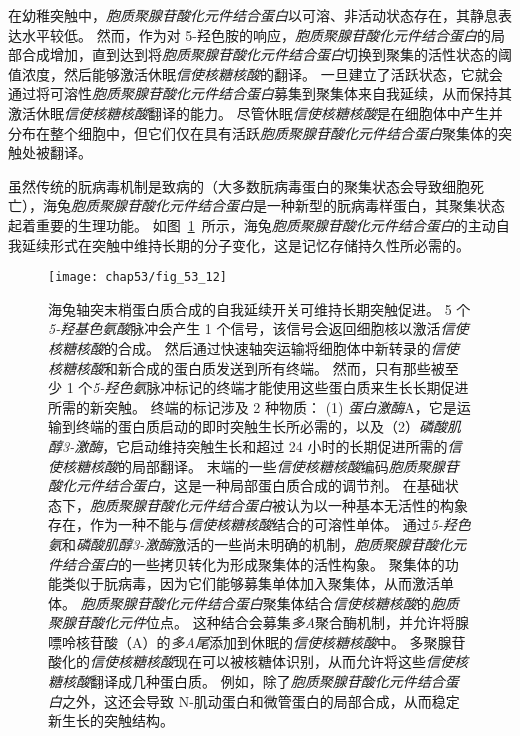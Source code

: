 在幼稚突触中，\textit{胞质聚腺苷酸化元件结合蛋白}以可溶、非活动状态存在，其静息表达水平较低。
然而，作为对 5-羟色胺的响应，\textit{胞质聚腺苷酸化元件结合蛋白}的局部合成增加，直到达到将\textit{胞质聚腺苷酸化元件结合蛋白}切换到聚集的活性状态的阈值浓度，然后能够激活休眠\textit{信使核糖核酸}的翻译。
一旦建立了活跃状态，它就会通过将可溶性\textit{胞质聚腺苷酸化元件结合蛋白}募集到聚集体来自我延续，从而保持其激活休眠\textit{信使核糖核酸}翻译的能力。
尽管休眠\textit{信使核糖核酸}是在细胞体中产生并分布在整个细胞中，但它们仅在具有活跃\textit{胞质聚腺苷酸化元件结合蛋白}聚集体的突触处被翻译。


虽然传统的朊病毒机制是致病的（大多数朊病毒蛋白的聚集状态会导致细胞死亡），海兔\textit{胞质聚腺苷酸化元件结合蛋白}是一种新型的朊病毒样蛋白，其聚集状态起着重要的生理功能。
如图~\ref{fig:53_12}~所示，海兔\textit{胞质聚腺苷酸化元件结合蛋白}的主动自我延续形式在突触中维持长期的分子变化，这是记忆存储持久性所必需的。


\begin{figure}[htbp]
	\centering
	\texttt{[image: chap53/fig\_53\_12]}
	\caption{海兔轴突末梢蛋白质合成的自我延续开关可维持长期突触促进。
		5 个\textit{5-羟基色氨酸}脉冲会产生 1 个信号，该信号会返回细胞核以激活\textit{信使核糖核酸}的合成。
		然后通过快速轴突运输将细胞体中新转录的\textit{信使核糖核酸}和新合成的蛋白质发送到所有终端。
		然而，只有那些被至少 1 个\textit{5-羟色氨}脉冲标记的终端才能使用这些蛋白质来生长长期促进所需的新突触。
		终端的标记涉及 2 种物质：
		(1) \textit{蛋白激酶}A，它是运输到终端的蛋白质启动的即时突触生长所必需的，以及（2）\textit{磷酸肌醇3-激酶}，它启动维持突触生长和超过 24 小时的长期促进所需的\textit{信使核糖核酸}的局部翻译。
		末端的一些\textit{信使核糖核酸}编码\textit{胞质聚腺苷酸化元件结合蛋白}，这是一种局部蛋白质合成的调节剂。
		在基础状态下，\textit{胞质聚腺苷酸化元件结合蛋白}被认为以一种基本无活性的构象存在，作为一种不能与\textit{信使核糖核酸}结合的可溶性单体。
		通过\textit{5-羟色氨}和\textit{磷酸肌醇3-激酶}激活的一些尚未明确的机制，\textit{胞质聚腺苷酸化元件结合蛋白}的一些拷贝转化为形成聚集体的活性构象。
		聚集体的功能类似于朊病毒，因为它们能够募集单体加入聚集体，从而激活单体。
		\textit{胞质聚腺苷酸化元件结合蛋白}聚集体结合\textit{信使核糖核酸}的\textit{胞质聚腺苷酸化元件}位点。
		这种结合会募集\textit{多A}聚合酶机制，并允许将腺嘌呤核苷酸（A）的\textit{多A尾}添加到休眠的\textit{信使核糖核酸}中。
		多聚腺苷酸化的\textit{信使核糖核酸}现在可以被核糖体识别，从而允许将这些\textit{信使核糖核酸}翻译成几种蛋白质。
		例如，除了\textit{胞质聚腺苷酸化元件结合蛋白}之外，这还会导致 N-肌动蛋白和微管蛋白的局部合成，从而稳定新生长的突触结构\cite{bailey2004persistence}。}
	\label{fig:53_12}
\end{figure}


